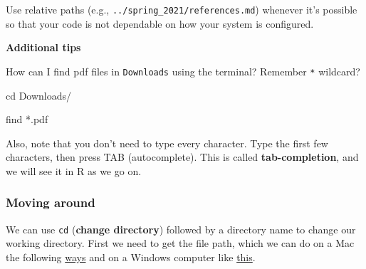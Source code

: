 \documentclass[
  letterpaper,
  DIV=11,
  numbers=noendperiod]{scrreprt}
\newenvironment{Shaded}{\begin{snugshade}}{\end{snugshade}}
\newcommand{\BuiltInTok}[1]{\textcolor[rgb]{0.00,0.23,0.31}{#1}}
\newcommand{\ExtensionTok}[1]{\textcolor[rgb]{0.00,0.23,0.31}{#1}}
\newcommand{\FunctionTok}[1]{\textcolor[rgb]{0.28,0.35,0.67}{#1}}
\newcommand{\NormalTok}[1]{\textcolor[rgb]{0.00,0.23,0.31}{#1}}
\newcommand{\PreprocessorTok}[1]{\textcolor[rgb]{0.68,0.00,0.00}{#1}}
\begin{document}
\begin{Shaded}
\end{Shaded}

Use relative paths (e.g., \texttt{../spring\_2021/references.md})
whenever it's possible so that your code is not dependable on how your
system is configured.

\textbf{Additional tips}

How can I find pdf files in \texttt{Downloads} using the terminal?
Remember \texttt{*} wildcard?

\begin{Shaded}
\begin{Highlighting}[]
\BuiltInTok{cd}\NormalTok{ Downloads/ }

\FunctionTok{find} \PreprocessorTok{*}\NormalTok{.pdf}
\end{Highlighting}
\end{Shaded}

Also, note that you don't need to type every character. Type the first
few characters, then press TAB (autocomplete). This is called
\textbf{tab-completion}, and we will see it in R as we go on.

\hypertarget{moving-around}{%
\subsubsection*{Moving around}\label{moving-around}}

We can use \texttt{cd} (\textbf{change directory}) followed by a
directory name to change our working directory. First we need to get the
file path, which we can do on a Mac the following
\href{https://setapp.com/how-to/how-to-find-the-path-of-a-file-in-mac}{ways}
and on a Windows computer like
\href{https://www.howtogeek.com/670447/how-to-copy-the-full-path-of-a-file-on-windows-10/}{this}.
\end{document}

